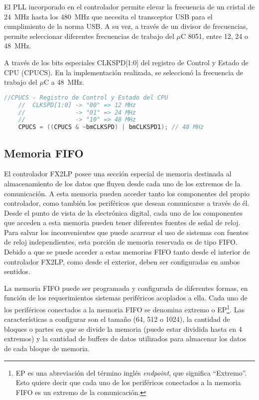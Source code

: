 	El PLL incorporado en el controlador permite elevar la frecuencia de un cristal de \SI{24}{\mega\hertz} hasta los \SI{480}{\mega\hertz} que necesita el transceptor USB para el cumplimiento de la norma USB. A su vez, a través de un divisor de frecuencias, permite seleccionar diferentes frecuencias de trabajo del $\mu$C 8051, entre \si{12}, \si{24} o \SI{48}{\mega\hertz}.
	
	A través de los bits especiales CLKSPD[1:0] del registro de Control y Estado de CPU (CPUCS). En la implementación realizada, se seleccionó la frecuencia de trabajo del $\mu$C a \SI{48}{\mega\hertz}.
	
	\begin{lstlisting}[language=C,backgroundcolor=\color{gray!30}]
	//CPUCS - Registro de Control y Estado del CPU
	//	CLKSPD[1:0] -> "00" => 12 MHz
	//				-> "01" => 24 MHz
	//				-> "10" => 48 MHz
	CPUCS = ((CPUCS & ~bmCLKSPD) | bmCLKSPD1); // 48 MHz
	\end{lstlisting}	

\subsection{Memoria FIFO}
	El controlador FX2LP posee una sección especial de memoria destinada al almacenamiento de los datos que fluyen desde cada uno de los extremos de la comunicación. A esta memoria pueden acceder tanto los componentes del propio controlador, como también los periféricos que desean comunicarse a través de él. Desde el punto de vista de la electrónica digital, cada uno de los componentes que acceden a esta memoria pueden tener diferentes fuentes de señal de reloj. Para salvar los inconvenientes que puede acarrear el uso de sistemas con fuentes de reloj independientes, esta porción de memoria reservada es de tipo FIFO. Debido a que se puede acceder a estas memorias FIFO tanto desde el interior de controlador FX2LP, como desde el exterior, deben ser configuradas en ambos sentidos.
	
	La memoria FIFO puede ser programada y configurada de diferentes formas, en función de los requerimientos sistemas periféricos acoplados a ella. Cada uno de los periféricos conectados a la memoria FIFO se denomina extremo o EP\footnote{EP es una abreviación del término inglés {\it endpoint}, que significa ``Extremo''. Esto quiere decir que cada uno de los periféricos conectados a la memoria FIFO es un extremo de la comunicación.}. Las características a configurar son el tamaño (\si{64}, \si{512} o \SI{1024}{\byte}), la cantidad de bloques o partes en que se divide la memoria (puede estar dividida hasta en 4 extremos) y la cantidad de buffers de datos utilizados para almacenar los datos de cada bloque de memoria.
	
